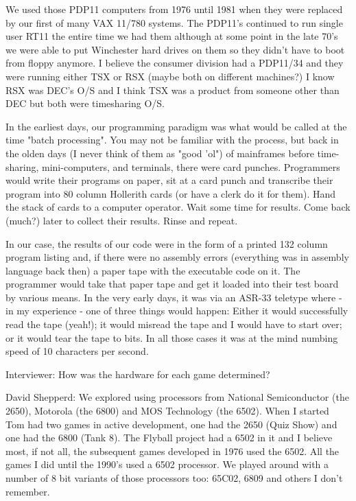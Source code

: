 We used those PDP11 computers from 1976 until 1981 when they were replaced by our first of many VAX 11/780 systems. The PDP11's continued to run single user RT11 the entire time we had them although at some point in the late 70's we were able to put Winchester hard drives on them so they didn't have to boot from floppy anymore. I believe the consumer division had a PDP11/34 and they were running either TSX or RSX (maybe both on different machines?) I know RSX was DEC's O/S and I think TSX was a product from someone other than DEC but both were timesharing O/S.

In the earliest days, our programming paradigm was what would be called at the time "batch processing". You may not be familiar with the process, but back in the olden days (I never think of them as "good 'ol") of mainframes before time-sharing, mini-computers, and terminals, there were card punches. Programmers would write their programs on paper, sit at a card punch and transcribe their program into 80 column Hollerith cards (or have a clerk do it for them). Hand the stack of cards to a computer operator. Wait some time for results. Come back (much?) later to collect their results. Rinse and repeat. 

In our case, the results of our code were in the form of a printed 132 column program listing and, if there were no assembly errors (everything was in assembly language back then) a paper tape with the executable code on it. The programmer would take that paper tape and get it loaded into their test board by various means. In the very early days, it was via an ASR-33 teletype where - in my experience - one of three things would happen: Either it would successfully read the tape (yeah!); it would misread the tape and I would have to start over; or it would tear the tape to bits. In all those cases it was at the mind numbing speed of 10 characters per second.

\textcolor{interviewer}{Interviewer:} How was the hardware for each game determined?

\textcolor{interviewee}{David Shepperd:} We explored using processors from National Semiconductor (the 2650), Motorola (the 6800) and MOS Technology (the 6502). When I started Tom had two games in active development, one had the 2650 (Quiz Show) and one had the 6800 (Tank 8). The Flyball project had a 6502 in it and I believe most, if not all, the subsequent games developed in 1976 used the 6502. All the games I did until the 1990's used a 6502 processor. We played around with a number of 8 bit variants of those processors too: 65C02, 6809 and others I don't remember. 

